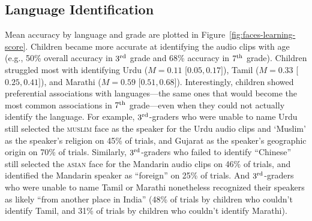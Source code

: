 \documentclass{foushee-adapted-preprint}
\begin{document}
\subsection*{Language Identification}
Mean accuracy by language and grade are plotted in Figure~\ref{fig:faces-learning-score}. Children became more accurate at identifying the audio clips with age (e.g., 50\% overall accuracy in $3^{\textnormal{rd}}$ grade and 68\% accuracy in $7^{\textnormal{th}}$ grade). Children struggled most with identifying Urdu ($M=0.11$ [$0.05, 0.17]$), Tamil ($M=0.33$ [$0.25, 0.41]$), and Marathi ($M=0.59$ [$0.51, 0.68]$). 
Interestingly, children showed preferential associations with languages---the same ones that would become the most common associations in $7^{\textnormal{th}}$ grade---even when they could not actually identify the language. For example, $3^{\textnormal{rd}}$-graders who were unable to name Urdu still selected the \textsc{muslim} face as the speaker for the Urdu audio clips and `Muslim' as the speaker's religion on 45\% of trials, and Gujarat as the speaker's geographic origin on 70\% of trials. Similarly, $3^{\textnormal{rd}}$-graders who failed to identify ``Chinese'' still selected the \textsc{asian} face for the Mandarin audio clips on 46\% of trials, and identified the Mandarin speaker as ``foreign'' on 25\% of trials. And $3^{\textnormal{rd}}$-graders who were unable to name Tamil or Marathi nonetheless recognized their speakers as likely ``from another place in India'' (48\% of trials by children who couldn't identify Tamil, and 31\% of trials by children who couldn't identify Marathi).  %
\end{document}

